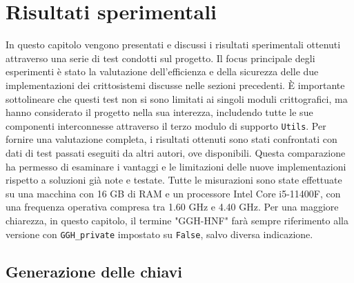 \chapter{Risultati sperimentali}
\label{sec:risultati_sperimentali}

In questo capitolo vengono presentati e discussi i risultati sperimentali ottenuti 
attraverso una serie di test condotti sul progetto.
Il focus principale degli esperimenti è stato la valutazione dell'efficienza e della 
sicurezza delle due implementazioni dei crittosistemi discusse nelle sezioni precedenti. 
È importante sottolineare che questi test non si sono limitati ai singoli moduli 
crittografici, ma hanno considerato il progetto nella sua interezza, includendo tutte 
le sue componenti interconnesse attraverso il terzo modulo di supporto \texttt{Utils}.
Per fornire una valutazione completa, i risultati ottenuti sono stati confrontati con dati 
di test passati eseguiti da altri autori, ove disponibili. 
Questa comparazione ha permesso di esaminare i vantaggi e le limitazioni delle nuove 
implementazioni rispetto a soluzioni già note e testate.
Tutte le misurazioni sono state effettuate su una macchina con 16 GB di RAM e un processore 
Intel Core i5-11400F, con una frequenza operativa compresa tra 1.60 GHz e 4.40 GHz.
Per una maggiore chiarezza, in questo capitolo, il termine "GGH-HNF" farà sempre riferimento 
alla versione con \texttt{GGH\_private} impostato su \texttt{False}, salvo diversa indicazione.

\section{Generazione delle chiavi}
\label{sec:risultati_chiavi}

